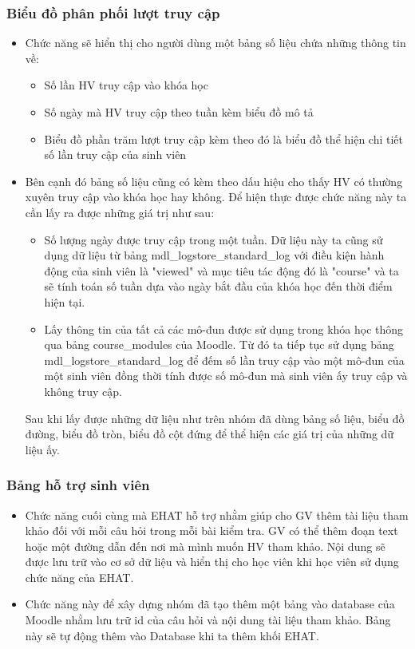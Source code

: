 \subsubsection{Biểu đồ phân phối lượt truy cập}
\begin{itemize}
	\item Chức năng sẽ hiển thị cho người dùng một bảng số liệu chứa những thông tin về:
	\begin{itemize}
		\item Số lần HV truy cập vào khóa học
		\item Số ngày mà HV truy cập theo tuần kèm biểu đồ mô tả
		\item Biểu đồ phần trăm lượt truy cập kèm theo đó là biểu đồ thể hiện chi tiết số lần truy cập của sinh viên
	\end{itemize}
	
	\item Bên cạnh đó bảng số liệu cũng có kèm theo dấu hiệu cho thấy HV có thường xuyên truy cập vào khóa học hay không. Để hiện thực được chức năng này ta cần lấy ra được những giá trị như sau:
	
	\begin{itemize}
		\item Số lượng ngày được truy cập trong một tuần. Dữ liệu này ta cũng sử dụng dữ liệu từ bảng mdl\_logstore\_standard\_log với điều kiện hành động của sinh viên là "viewed" và mục tiêu tác động đó là "course" và ta sẽ tính toán số tuần dựa vào ngày bắt đầu của khóa học đến thời điểm hiện tại.
		
		\item Lấy thông tin của tất cả các mô-đun được sử dụng trong khóa học thông qua bảng course\_modules của Moodle. Từ đó ta tiếp tục sử dụng bảng mdl\_logstore\_standard\_log để đếm số lần truy cập vào một mô-đun của một sinh viên đồng thời tính được số mô-đun mà sinh viên ấy truy cập và không truy cập.
	\end{itemize}
	
	Sau khi lấy được những dữ liệu như trên nhóm đã dùng bảng số liệu, biểu đồ đường, biểu đồ tròn, biểu đồ cột đứng để thể hiện các giá trị của những dữ liệu ấy.
	
\end{itemize}

\subsubsection{Bảng hỗ trợ sinh viên}
\begin{itemize}
	\item Chức năng cuối cùng mà EHAT hỗ trợ nhằm giúp cho GV thêm tài liệu tham khảo đối với mỗi câu hỏi trong mỗi bài kiểm tra. GV có thể thêm đoạn text hoặc một đường dẫn đến nơi mà mình muốn HV tham khảo. Nội dung sẽ được lưu trữ vào cơ sở dữ liệu và hiển thị cho học viên khi học viên sử dụng chức năng của EHAT.
	
	\item Chức năng này để xây dựng nhóm đã tạo thêm một bảng vào database của Moodle nhằm lưu trữ id của câu hỏi và nội dung tài liệu tham khảo. Bảng này sẽ tự động thêm vào Database khi ta thêm khối EHAT.
\end{itemize}

